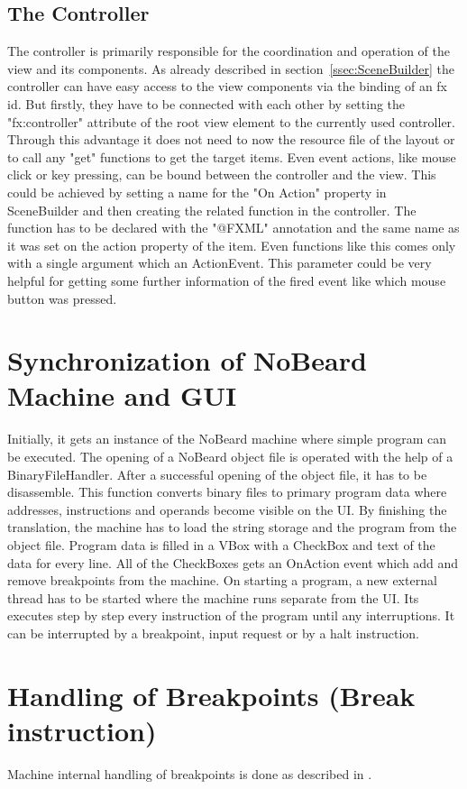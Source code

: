 \subsection{The Controller}
The controller is primarily responsible for the coordination and operation of the view and its components. As already described in section~\ref{ssec:SceneBuilder} the controller can have easy access to the view components via the binding of an fx id. But firstly, they have to be connected with each other by setting the "fx:controller" attribute of the root view element to the currently used controller. Through this advantage it does not need to now the resource file of the layout or to call any "get" functions to get the target items. Even event actions, like mouse click or key pressing, can be bound between the controller and the view. This could be achieved by setting a name for the "On Action" property in SceneBuilder and then creating the related function in the controller. The function has to be declared with the "@FXML" annotation and the same name as it was set on the action property of the item. Even functions like this comes only with a single argument which an ActionEvent. This parameter could be very helpful for getting some further information of the fired event like which mouse button was pressed.

\section{Synchronization of NoBeard Machine and GUI}
\label{synchronization} 
Initially, it gets an instance of the NoBeard machine where simple program can be executed. The opening of a NoBeard object file is operated with the help of a BinaryFileHandler. After a successful opening of the object file, it has to be disassemble. This function converts binary files to primary program data where addresses, instructions and operands become visible on the UI.
By finishing the translation, the machine has to load the string storage and the program from the object file. Program data is filled in a VBox with a CheckBox and text of the data for every line. All of the CheckBoxes gets an OnAction event which add and remove breakpoints from the machine. 
On starting a program, a new external thread has to be started where the machine runs separate from the UI. Its executes step by step every instruction of the program until any interruptions. It can be interrupted by a breakpoint, input request or by a halt instruction.
\section{Handling of Breakpoints (Break instruction)}
Machine internal handling of breakpoints is done as described in \cite{bendersky_how_nodate}.

